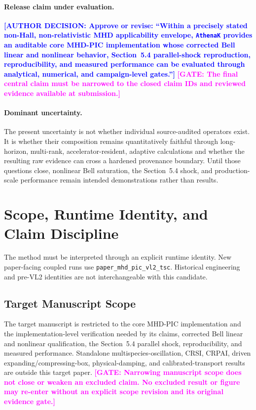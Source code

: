 \documentclass[twocolumn]{aastex701}
\newcommand{\athenak}{\texttt{AthenaK}\xspace}
\newcommand{\runtime}{\texttt{paper\_mhd\_pic\_vl2\_tsc}\xspace}
\newcommand{\GATE}[1]{\textcolor{magenta}{\textbf{[GATE: #1]}}}
\newcommand{\AUTHOR}[1]{\textcolor{blue}{\textbf{[AUTHOR DECISION: #1]}}}
\begin{document}
\paragraph{Release claim under evaluation.}
\AUTHOR{Approve or revise: ``Within a precisely stated non-Hall, non-relativistic
MHD applicability envelope, \athenak provides an auditable core MHD-PIC
implementation whose corrected Bell linear and nonlinear behavior,
Section~5.4 parallel-shock reproduction, reproducibility, and measured
performance can be evaluated through analytical, numerical, and campaign-level
gates.''}
\GATE{The final central claim must be narrowed to the closed claim IDs and
reviewed evidence available at submission.}

\paragraph{Dominant uncertainty.}
The present uncertainty is not whether individual source-audited operators
exist. It is whether their composition remains quantitatively faithful through
long-horizon, multi-rank, accelerator-resident, adaptive calculations and
whether the resulting raw evidence can cross a hardened provenance boundary.
Until those questions close, nonlinear Bell saturation, the Section~5.4 shock,
and production-scale performance remain intended demonstrations rather than
results.

\section{Scope, Runtime Identity, and Claim Discipline}
\label{sec:scope}

The method must be interpreted through an explicit runtime identity. New
paper-facing coupled runs use \runtime. Historical engineering and pre-VL2
identities are not interchangeable with this candidate.

\subsection{Target Manuscript Scope}

The target manuscript is restricted to the core MHD-PIC implementation and the
implementation-level verification needed by its claims, corrected Bell linear
and nonlinear qualification, the Section~5.4 parallel shock, reproducibility,
and measured performance. Standalone multispecies-oscillation, CRSI, CRPAI,
driven expanding/compressing-box, physical-damping, and calibrated-transport
results are outside this target paper.
\GATE{Narrowing manuscript scope does not close or weaken an excluded claim.
No excluded result or figure may re-enter without an explicit scope revision
and its original evidence gate.}
\end{document}
